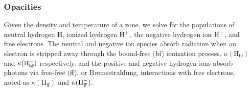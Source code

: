 \subsubsection{Opacities}
Given the density and temperature of a zone, we solve for the populations of neutral hydrogen H, ionized hydrogen ${\rm H}^+$, the negative hydrogen ion ${\rm H}^-$, and free electrons.
The neutral and negative ion species absorb radiation when an electron is stripped away through the bound-free (bf) ionization process, $\kappa(\text{H}_\text{bf})$ and $\kappa({{\rm H}^-_\text{bf}})$ respectively, and the positive and negative hydrogen ions absorb photons via free-free (ff), or Bremsstrahlung, interactions with free electrons, noted as $\kappa (\text{H}_\text{ff})$ and $\kappa ({\rm H}^-_\text{ff})$.

